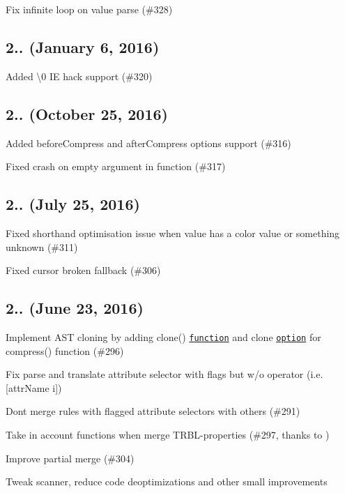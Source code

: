 
\begin{DoxyItemize}
\item Fix infinite loop on value parse (\#328)
\end{DoxyItemize}

\subsection*{2.. (January 6, 2016)}


\begin{DoxyItemize}
\item Added {\ttfamily \textbackslash{}0} IE hack support (\#320)
\end{DoxyItemize}

\subsection*{2.. (October 25, 2016)}


\begin{DoxyItemize}
\item Added {\ttfamily before\+Compress} and {\ttfamily after\+Compress} options support (\#316)
\item Fixed crash on empty argument in function (\#317)
\end{DoxyItemize}

\subsection*{2.. (July 25, 2016)}


\begin{DoxyItemize}
\item Fixed shorthand optimisation issue when value has a color value or something unknown (\#311)
\item Fixed {\ttfamily cursor} broken fallback (\#306)
\end{DoxyItemize}

\subsection*{2.. (June 23, 2016)}


\begin{DoxyItemize}
\item Implement A\+ST cloning by adding {\ttfamily clone()} \href{https://github.com/css/csso#cloneast}{\tt function} and {\ttfamily clone} \href{https://github.com/css/csso#compressast-options}{\tt option} for {\ttfamily compress()} function (\#296)
\item Fix parse and translate attribute selector with flags but w/o operator (i.\+e. {\ttfamily \mbox{[}attr\+Name i\mbox{]}})
\item Don\textquotesingle{}t merge rules with flagged attribute selectors with others (\#291)
\item Take in account functions when merge T\+R\+B\+L-\/properties (\#297, thanks to )
\item Improve partial merge (\#304)
\item Tweak scanner, reduce code deoptimizations and other small improvements
\end{DoxyItemize}


